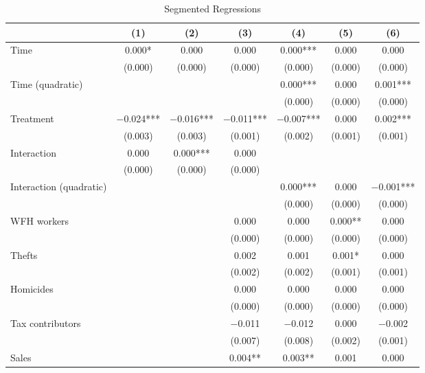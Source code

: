 \documentclass[11pt,a4paper]{article}\usepackage[]{graphicx}\usepackage[]{xcolor}
\begin{document}
\begin{table}[htbp!]
\caption{Segmented Regressions}
\label{tab:regseg}

\begin{tabular}[t]{lcccccc}
\toprule
  & (1) & (2) & (3) & (4) & (5) & (6)\\
\midrule
Time & \num{0.000}* & \num{0.000} & \num{0.000} & \num{0.000}*** & \num{0.000} & \num{0.000}\\
 & (\num{0.000}) & (\num{0.000}) & (\num{0.000}) & (\num{0.000}) & (\num{0.000}) & (\num{0.000})\\
Time (quadratic) &  &  &  & \num{0.000}*** & \num{0.000} & \num{0.001}***\\
 &  &  &  & (\num{0.000}) & (\num{0.000}) & \vphantom{1} (\num{0.000})\\
Treatment & \num{-0.024}*** & \num{-0.016}*** & \num{-0.011}*** & \num{-0.007}*** & \num{0.000} & \num{0.002}***\\
 & (\num{0.003}) & (\num{0.003}) & (\num{0.001}) & (\num{0.002}) & (\num{0.001}) & (\num{0.001})\\
Interaction & \num{0.000} & \num{0.000}*** & \num{0.000} &  &  & \\
 & (\num{0.000}) & (\num{0.000}) & (\num{0.000}) &  &  & \\
Interaction (quadratic) &  &  &  & \num{0.000}*** & \num{0.000} & \num{-0.001}***\\
 &  &  &  & (\num{0.000}) & (\num{0.000}) & (\num{0.000})\\
WFH workers &  &  & \num{0.000} & \num{0.000} & \num{0.000}** & \num{0.000}\\
 &  &  & (\num{0.000}) & (\num{0.000}) & (\num{0.000}) & \vphantom{2} (\num{0.000})\\
Thefts &  &  & \num{0.002} & \num{0.001} & \num{0.001}* & \num{0.000}\\
 &  &  & (\num{0.002}) & (\num{0.002}) & (\num{0.001}) & (\num{0.001})\\
Homicides &  &  & \num{0.000} & \num{0.000} & \num{0.000} & \num{0.000}\\
 &  &  & (\num{0.000}) & (\num{0.000}) & (\num{0.000}) & \vphantom{1} (\num{0.000})\\
Tax contributors &  &  & \num{-0.011} & \num{-0.012} & \num{0.000} & \num{-0.002}\\
 &  &  & (\num{0.007}) & (\num{0.008}) & (\num{0.002}) & (\num{0.001})\\
Sales &  &  & \num{0.004}** & \num{0.003}** & \num{0.001} & \num{0.000}\\

\end{tabular}
\end{table}
\end{document}
